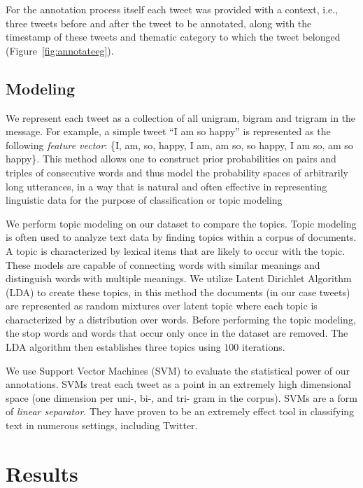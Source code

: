 \documentclass[11pt]{article}
\begin{document}
For the annotation process itself each tweet was provided with a context, i.e., three tweets before and after the tweet to be annotated, along with the timestamp of these tweets and thematic category to which the tweet belonged (Figure~\ref{fig:annotateeg}).






\subsection{Modeling}
We represent each tweet as a collection of  all unigram, bigram and trigram in the message. For example, a simple tweet ``I am so happy'' is represented as the following \emph{feature vector}: \{I, am, so, happy, I am, am so, so happy, I am so, am so happy\}. This method allows one to construct prior probabilities on pairs and triples of consecutive words and thus model the probability spaces of arbitrarily long utterances, in a way that is natural and often effective in representing linguistic data for the purpose of classification or topic modeling



We perform topic modeling on our dataset to compare the topics. Topic modeling is often used to analyze text data by finding topics within a corpus of documents. A topic is characterized by lexical items that are likely to occur with the topic. These models are capable of connecting words with similar meanings and distinguish words with multiple meanings. We utilize  Latent Dirichlet Algorithm (LDA) \cite{Blei} to create these topics, in this method the documents (in our case tweets) are represented as random mixtures over latent topic where each topic is characterized by a distribution over words. Before performing the topic modeling, the stop words and words that occur only once in the dataset are removed. The LDA algorithm then establishes three topics using $100$ iterations. 

We use Support Vector Machines (SVM) to evaluate the statistical power of our annotations. SVMs treat each tweet as a point in an extremely high dimensional space (one dimension per uni-, bi-, and tri- gram in the corpus). SVMs are a form of \emph{linear separator}. They have proven to be an extremely effect tool in classifying text in numerous settings, including Twitter. 


\section{Results}
\end{document}
